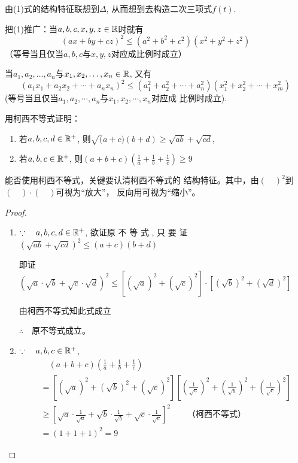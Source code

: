 \begin{rmk}
    由(1)式的结构特征联想到$\Delta$, 从而想到去构造二次三项式$f(t)$.
\end{rmk}

把(1)推广：当$a,b,c,x,y,z\in \mathbb{R}$时就有
\begin{equation}
    (ax+by+cz)^{2}\le (a^{2}+b^{2}+c^{2})(x^{2}+y^{2}+z^{2})\tag{2}
\end{equation}
（等号当且仅当$a,b,c$与$x,y,z$对应成比例时成立）

当$a_1,a_2,\ldots,a_n$与$x_1,x_2,\ldots,x_n\in \mathbb{R}$, 又有
\begin{equation}
    (a_1x_1+a_2x_2+\cdots+a_nx_n)^2\le (a_1^2+a_2^2+\cdots+a_n^2)(x_1^2+
x_{2}^{2}+\cdots+x_{m}^{2}) \tag{3}
\end{equation}
(等号当且仅当$a_1,a_2,\cdots,a_n$与$x_1,x_2,\cdots,x_n$对应成
比例时成立).

\begin{example}
    用柯西不等式证明：
\begin{enumerate}[(1)]
    \item 若$a,b,c,d\in \mathbb{R}^+$, 则$\sqrt(a+c)(b+d)\geqslant\sqrt{ab}+\sqrt{cd}$,
\item 若$a,b,c\in \mathbb{R}^{+}$, 则$(a+b+c)\left(\frac1a+\frac1b+\frac1c\right)\ge 9$
\end{enumerate}
\end{example}

\begin{analyze}
    能否使用柯西不等式，关键要认清柯西不等式的
结构特征。其中，由$(\quad)^{2}$到$(\quad)\cdot(\quad)$可视为“放大”，
反向用可视为“缩小”。
\end{analyze}


\begin{proof}
\begin{enumerate}[(1)]
    \item $\because\quad a, b, c, d\in \mathbb{R}^{+ }$, 欲证原 不 等 式 , 只 要 证 
$\left(\sqrt{ab}+\sqrt{cd}\right)^2\leq (a+c)(b+d)$

即证$\left(\sqrt{a}\cdot\sqrt{b}+\sqrt{c}\cdot\sqrt{d}\right)^{2}\le \left[\left(\sqrt{a}\right)^{2}+\left(\sqrt{c}\right)^{2}\right]\cdot \left[\left(\sqrt{b}\right)^{2}+\left(\sqrt{d}\right)^{2}\right]$

由柯西不等式知此式成立

$\therefore\quad $原不等式成立。
\item $\because\quad  a,b,c\in \mathbb{R}^{+}$,
\[\begin{split}
&\quad (a+b+c)\left(\frac{1}{a}+\frac{1}{b}+\frac{1}{c}\right)\\
&=\left[(\sqrt{a})^2+(\sqrt{b})^2+(\sqrt{c})^2\right]\left[\left(\frac{1}{\sqrt{a}}\right)^2+\left(\frac{1}{\sqrt{b}}\right)^2+\left(\frac{1}{\sqrt{c}}\right)^2\right]\\
&\ge \left[\sqrt{a}\cdot\frac{1}{\sqrt{a}}+\sqrt{b}\cdot\frac{1}{\sqrt{b}}+\sqrt{c}\cdot\frac{1}{\sqrt{c}}\right]^2 \qquad  \text{（柯西不等式）}\\
&=(1+1+1)^2=9
\end{split}\]
\end{enumerate}
\end{proof}

